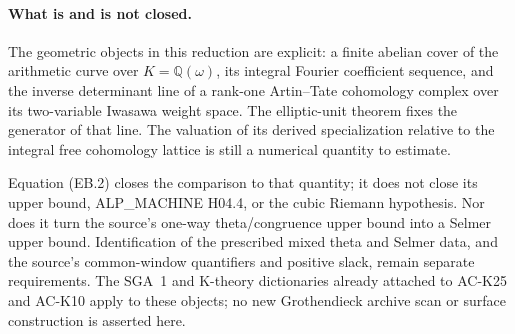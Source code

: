 \paragraph{What is and is not closed.}
The geometric objects in this reduction are explicit:
a finite abelian cover of the arithmetic curve over
$K=\mathbb Q(\omega)$, its integral Fourier coefficient
sequence, and the inverse determinant line of a
rank-one Artin--Tate cohomology complex over its
two-variable Iwasawa weight space.  The elliptic-unit
theorem fixes the generator of that line.  The
valuation of its derived specialization relative to
the integral free cohomology lattice is still a
numerical quantity to estimate.

Equation (EB.2) closes the comparison to that quantity;
it does not close its upper bound, ALP\_MACHINE H04.4,
or the cubic Riemann hypothesis.  Nor does it turn
the source's one-way theta/congruence upper bound
into a Selmer upper bound.  Identification of the
prescribed mixed theta and Selmer data, and the
source's common-window quantifiers and positive
slack, remain separate requirements.  The SGA~1
and K-theory dictionaries already attached to
AC-K25 and AC-K10 apply to these objects; no new
Grothendieck archive scan or surface construction
is asserted here.
